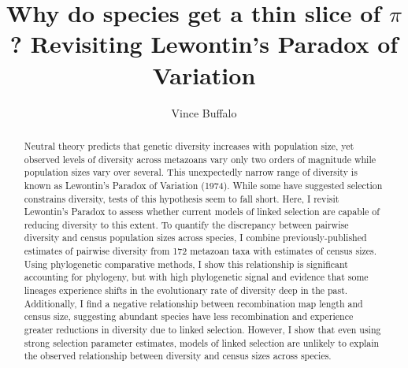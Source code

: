 \documentclass[11pt]{article}
\title{Why do species get a thin slice of $\pi$? Revisiting Lewontin's Paradox of Variation}
\author{Vince Buffalo}
\affil[]{\footnotesize University of Oregon, Institute of Ecology and Evolution\\Eugene, Oregon \\ \href{mailto:vsbuffalo@gmail.com}{vsbuffalo@gmail.com}}
\begin{document}
\maketitle




\begin{abstract} 

 Neutral theory predicts that genetic diversity increases with population size,
 yet observed levels of diversity across metazoans vary only two orders of
 magnitude while population sizes vary over several. This unexpectedly narrow
 range of diversity is known as Lewontin's Paradox of Variation (1974). While
 some have suggested selection constrains diversity, tests of this hypothesis
 seem to fall short. Here, I revisit Lewontin's Paradox to assess whether
 current models of linked selection are capable of reducing diversity to this
 extent. To quantify the discrepancy between pairwise diversity and census
 population sizes across species, I combine previously-published estimates of
 pairwise diversity from 172 metazoan taxa with estimates of census sizes.
 Using phylogenetic comparative methods, I show this relationship is
 significant accounting for phylogeny, but with high phylogenetic signal and
 evidence that some lineages experience shifts in the evolutionary rate of
 diversity deep in the past. Additionally, I find a negative relationship
 between recombination map length and census size, suggesting abundant species
 have less recombination and experience greater reductions in diversity due to
 linked selection. However, I show that even using strong selection parameter
 estimates, models of linked selection are unlikely to explain the observed
 relationship between diversity and census sizes across species.

\end{abstract}
\end{document}
